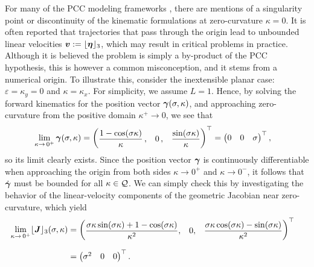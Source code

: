 \begin{rmk} For many of the PCC modeling frameworks \cite{Falkenhahn2015}, there are mentions of a singularity point or discontinuity of the kinematic formulations at zero-curvature $\kappa = 0$. It is often reported that trajectories that pass through the origin lead to unbounded linear velocities $\boldsymbol{v} := \lfloor{\boldsymbol{\eta}}\rfloor_3$, which may result in critical problems in practice. Although it is believed the problem is simply a by-product of the PCC hypothesis, this is however a common misconception, and it stems from a numerical origin. To illustrate this, consider the inextensible planar case: $\varepsilon = \kappa_y = 0$ and $\kappa = \kappa_x$.  For simplicity, we assume $L = 1$. Hence, by solving the forward kinematics for the position vector ${\boldsymbol{\gamma}}(\sigma,\kappa)$, and approaching zero-curvature from the positive domain $\kappa^{+} \to 0$, we see that
%
\begin{align}
\lim_{\kappa \to \,0^{+}}{\boldsymbol{\gamma}}(\sigma,\kappa) & = \begin{pmatrix} \dfrac{1-\cos(\sigma \kappa)}{\kappa}\,, & 0\,, & \dfrac{\sin(\sigma \kappa)}{\kappa} \end{pmatrix}^\top = \begin{pmatrix} 0 & 0 & \sigma \end{pmatrix}^\top,
\end{align}
%
so its limit clearly exists. Since the position vector ${\boldsymbol{\gamma}}$ is continuously differentiable when approaching the origin from both sides $\kappa \to 0^+$ and $\kappa \to 0^{-}$, it follows that $\dot{{\boldsymbol{\gamma}}}$ must be bounded for all $\kappa \in \mathcal{Q}$. We can simply check this by investigating the behavior of the linear-velocity components of the geometric Jacobian near zero-curvature, which yield
%
\begin{align}
\!\!\!\!\!\!\lim_{\kappa \to \,0^+} \lfloor{\boldsymbol{J}}\rfloor_3(\sigma,\kappa) & = \begin{pmatrix} \dfrac{\sigma \kappa \sin(\sigma \kappa) + 1 - \cos(\sigma \kappa)}{\kappa^2}, & 0, & \dfrac{\sigma \kappa \cos(\sigma \kappa) - \sin(\sigma \kappa) }{\kappa^2} \end{pmatrix}^\top \notag \\[0.75em] & = \begin{pmatrix} \sigma^2 & 0 & 0 \end{pmatrix}^\top.
\end{align}
%

\end{rmk}
